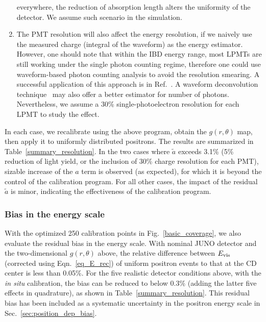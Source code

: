 \documentclass[a4paper,10pt,twoside]{cpc-hepnp}
\begin{document}
\begin{CJK*}{GB}{gbsn}
\begin{multicols}{2}
\begin{enumerate}
  everywhere, the reduction of absorption length alters the uniformity
  of the detector. We assume such scenario in the simulation.
\item The PMT resolution will also affect the
    energy resolution, if we naively use the measured charge (integral
    of the waveform) as the energy estimator. However, one should note
    that within the IBD energy range, most LPMTs are still working
    under the single photon counting regime, therefore one could use
    waveform-based photon counting analysis to avoid the resolution
    smearing. A successful application of this approach is in
    Ref.~\cite{Lux-single-photons}. A waveform deconvolution
    technique~\cite{huangyongbo-papper} may also offer a better
    estimator for number of photons. Nevertheless, we assume a 30\%
    single-photoelectron resolution for each LPMT to study the effect.
\end{enumerate}

In each case, we recalibrate using the above program, obtain the
$g(r,\theta)$ map, then apply it to uniformly distributed
positrons. The results are summarized in
Table~\ref{summary_resolution}. In the two cases
  where $\tilde a$ exceeds 3.1\% (5\% reduction of light yield, or the
  inclusion of 30\% charge resolution for each PMT), sizable increase
  of the $a$ term is observed (as expected), for which it is beyond
  the control of the calibration program. For all other cases, the
  impact of the residual $\tilde a$ is minor, indicating the
  effectiveness of the calibration program.


\subsubsection{Bias in the energy scale}
  With the optimized 250 calibration points in
  Fig.~\ref{basic_coverage}, we also evaluate the residual bias in the
  energy scale. With nominal JUNO detector and the two-dimensional
  $g(r,\theta)$ above, the relative difference between $E_{\rm vis}$
  (corrected using Eqn.~\ref{eq_E_rec}) of uniform positron events to
  that at the CD center is less than 0.05\%.  For the five realistic
  detector conditions above, with the {\it in situ} calibration, the
  bias can be reduced to below 0.3\% (adding the latter
  five effects in quadrature), as shown in
  Table~\ref{summary_resolution}. This residual bias has been included
  as a systematic uncertainty in the positron energy scale in
  Sec.~\ref{sec:position_dep_bias}. 



\end{multicols}
\end{CJK*}
\end{document}
